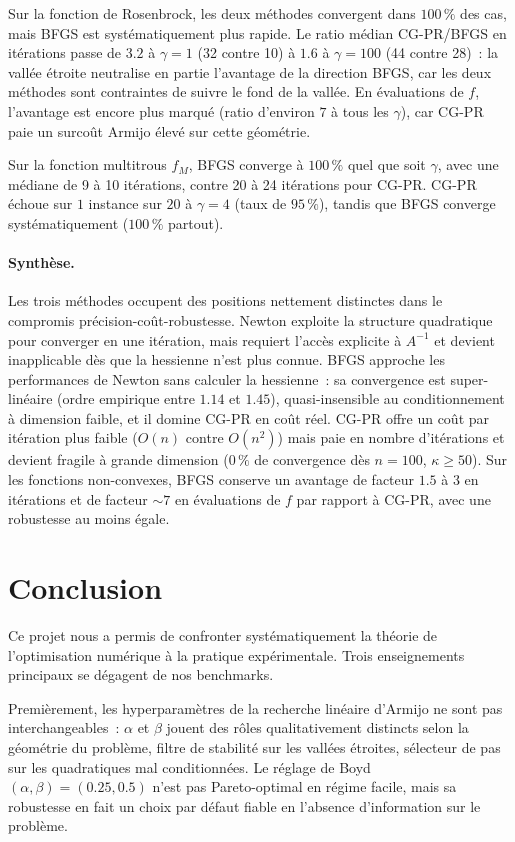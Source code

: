 \documentclass[10pt,a4paper]{article}
\begin{document}
Sur la fonction de Rosenbrock, les deux méthodes convergent dans $100\,\%$ des cas, mais BFGS est systématiquement plus rapide. Le ratio médian CG-PR/BFGS en itérations passe de $3.2$ à $\gamma = 1$ (32 contre 10) à $1.6$ à $\gamma = 100$ (44 contre 28)~: la vallée étroite neutralise en partie l'avantage de la direction BFGS, car les deux méthodes sont contraintes de suivre le fond de la vallée. En évaluations de $f$, l'avantage est encore plus marqué (ratio d'environ $7$ à tous les $\gamma$), car CG-PR paie un surcoût Armijo élevé sur cette géométrie.

Sur la fonction multitrous $f_M$, BFGS converge à $100\,\%$ quel que soit $\gamma$, avec une médiane de 9 à 10 itérations, contre 20 à 24 itérations pour CG-PR. CG-PR échoue sur $1$ instance sur $20$ à $\gamma = 4$ (taux de $95\,\%$), tandis que BFGS converge systématiquement ($100\,\%$ partout).

\paragraph{Synthèse.}
Les trois méthodes occupent des positions nettement distinctes dans le compromis précision-coût-robustesse. Newton exploite la structure quadratique pour converger en une itération, mais requiert l'accès explicite à $A^{-1}$ et devient inapplicable dès que la hessienne n'est plus connue. BFGS approche les performances de Newton sans calculer la hessienne~: sa convergence est super-linéaire (ordre empirique entre $1.14$ et $1.45$), quasi-insensible au conditionnement à dimension faible, et il domine CG-PR en coût réel. CG-PR offre un coût par itération plus faible ($O(n)$ contre $O(n^2)$) mais paie en nombre d'itérations et devient fragile à grande dimension ($0\,\%$ de convergence dès $n = 100$, $\kappa \geq 50$). Sur les fonctions non-convexes, BFGS conserve un avantage de facteur $1.5$ à $3$ en itérations et de facteur $\sim 7$ en évaluations de $f$ par rapport à CG-PR, avec une robustesse au moins égale.

\newpage

\section*{Conclusion}

Ce projet nous a permis de confronter systématiquement la théorie de l'optimisation numérique à la pratique expérimentale. Trois enseignements principaux se dégagent de nos benchmarks.

Premièrement, les hyperparamètres de la recherche linéaire d'Armijo ne sont pas interchangeables~: $\alpha$ et $\beta$ jouent des rôles qualitativement distincts selon la géométrie du problème, filtre de stabilité sur les vallées étroites, sélecteur de pas sur les quadratiques mal conditionnées. Le réglage de Boyd $(\alpha, \beta) = (0.25, 0.5)$ n'est pas Pareto-optimal en régime facile, mais sa robustesse en fait un choix par défaut fiable en l'absence d'information sur le problème.
\end{document}
